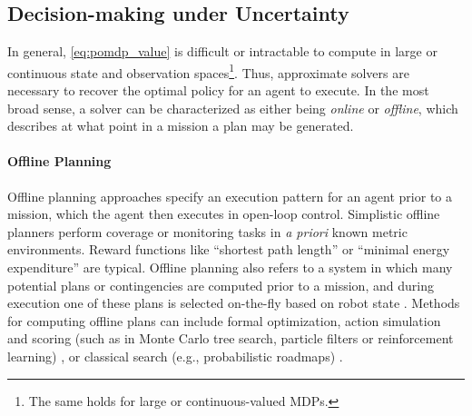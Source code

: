 
\subsection{Decision-making under Uncertainty}
In general, \cref{eq:pomdp_value} is difficult or intractable to compute in large or continuous state and observation spaces\footnote{The same holds for large or continuous-valued MDPs.}.
Thus, approximate solvers are necessary to recover the optimal policy for an agent to execute.
In the most broad sense, a solver can be characterized as either being \emph{online} or \emph{offline}, which describes at what point in a mission a plan may be generated.

\paragraph{Offline Planning}
Offline planning approaches specify an execution pattern for an agent prior to a mission, which the agent then executes in open-loop control.
Simplistic offline planners perform coverage or monitoring tasks \autocite{nikolos2003evolutionary,nam2016approach} in \emph{a priori} known metric environments.
Reward functions like ``shortest path length'' or ``minimal energy expenditure'' are typical.
Offline planning also refers to a system in which many potential plans or contingencies are computed prior to a mission, and during execution one of these plans is selected on-the-fly based on robot state \autocite{roa2012power}.
Methods for computing offline plans can include formal optimization, action simulation and scoring (such as in Monte Carlo tree search, particle filters or reinforcement learning) \autocite{yu2021combo,Arora2017,raja2012optimal}, or classical search (e.g., probabilistic roadmaps) \autocite{karaman2011sampling,karaman2011anytime}.

